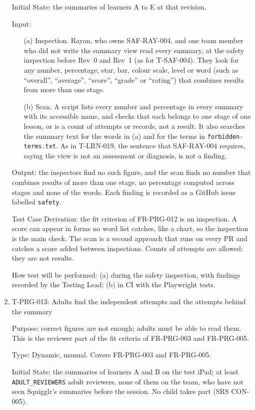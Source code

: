 \documentclass[12pt, titlepage]{article}
\newcommand{\testitem}[1]{\item #1\par\nopagebreak}
\begin{document}
\begin{enumerate}
Initial State: the summaries of learners A to E at that revision.

Input:
\begin{itemize}
\item[(a)] Inspection. Rayan, who owns SAF-RAY-004, and one team member
who did not write the summary view read every summary, at the safety
inspection before Rev~0 and Rev~1 (as for T-SAF-004). They look for any
number, percentage, star, bar, colour scale, level or word (such as
``overall'', ``average'', ``score'', ``grade'' or ``rating'') that combines
results from more than one stage.
\item[(b)] Scan. A script lists every number and percentage in every summary
with its accessible name, and checks that each belongs to one stage of one
lesson, or is a count of attempts or records, not a result. It also searches
the summary text for the words in (a) and for the terms in
\texttt{forbidden-\allowbreak{}terms.txt}. As in T-LRN-019, the sentence that
SAF-RAY-004 requires, saying the view is not an assessment or diagnosis, is not
a finding.
\end{itemize}

Output: the inspectors find no such figure, and the scan finds no number that
combines results of more than one stage, no percentage computed across
stages and none of the words. Each finding is recorded as a GitHub issue
labelled \texttt{safety}.

Test Case Derivation: the fit criterion of FR-PRG-012 is an inspection. A
score can appear in forms no word list catches, like a chart, so the
inspection is the main check. The scan is a second approach that runs on
every PR and catches a score added between inspections. Counts of attempts
are allowed: they are not results.

How test will be performed: (a) during the safety inspection, with findings
recorded by the Testing Lead; (b) in CI with the Playwright tests.

\testitem{T-PRG-013: Adults find the independent attempts and the attempts behind the summary}

Purpose: correct figures are not enough; adults must be able to read them.
This is the reviewer part of the fit criteria of FR-PRG-003 and FR-PRG-005.

Type: Dynamic, manual. Covers FR-PRG-003 and FR-PRG-005.

Initial State: the summaries of learners A and B on the test iPad; at
least \texttt{ADULT\_REVIEWERS} adult reviewers, none of them on the team,
who have not seen Squigglr's summaries before the session. No child takes part (SRS
CON-005).


\end{enumerate}
\end{document}

